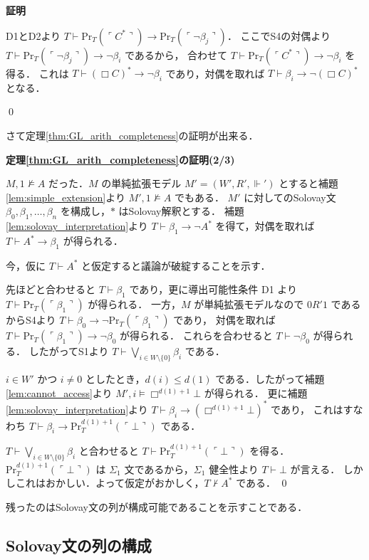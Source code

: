 \documentclass{jsarticle}
\makeatletter
\newcommand*{\Provable}{\mathrm{Pr}}
\theoremstyle{definition}
\renewcommand{\proofname}{証明}
\renewenvironment{proof}[1][\proofname]{\par
    \normalfont 
    \topsep6\p@\@plus6\p@\relax
    \trivlist
    \item\relax
    {\bfseries\gtfamily
    #1\@addpunct{.}}\hspace\labelsep\ignorespaces
    }{%
    \endtrivlist
    \@endpefalse
}
\makeatother
\begin{document}
\begin{proof}
\begin{itemize}
\begin{enumerate}
                D1とD2より $T \vdash \Provable_T(\ulcorner C^* \urcorner) \to \Provable_T(\ulcorner \lnot \beta_j \urcorner)$．
                ここでS4の対偶より $T \vdash \Provable_T(\ulcorner \lnot \beta_j \urcorner) \to \lnot \beta_i$ であるから，
                合わせて $T \vdash \Provable_T(\ulcorner C^* \urcorner) \to \lnot \beta_i$ を得る．
                これは $T \vdash (\Box C)^* \to \lnot \beta_i$ であり，対偶を取れば $T \vdash \beta_i \to \lnot (\Box C)^*$ となる．
            \end{enumerate}
    \end{itemize}
    \qed
\end{proof}

さて定理\ref{thm:GL_arith_completeness}の証明が出来る．

\begin{proof}[定理\ref{thm:GL_arith_completeness}の証明(2/3)]
    $M,1 \nvDash A$ だった．$M$ の単純拡張モデル $M' = (W', R', \Vdash')$ とすると補題\ref{lem:simple_extension}より $M',1 \nvDash A$ でもある．
    $M'$ に対してのSolovay文 $\beta_0, \beta_1, \dots, \beta_n$ を構成し，$*$ はSolovay解釈とする．
    補題\ref{lem:solovay_interpretation}より $T \vdash \beta_1 \to \lnot A^*$ を得て，対偶を取れば $T \vdash A^* \to \beta_1$ が得られる．

    今，仮に $T \vdash A^*$ と仮定すると議論が破綻することを示す．
    
    先ほどと合わせると $T \vdash \beta_1$ であり，更に導出可能性条件 D1 より $T \vdash \Provable_T(\ulcorner \beta_1 \urcorner)$ が得られる．
    一方，$M$ が単純拡張モデルなので $0 R' 1$ であるからS4より $T \vdash \beta_0 \to \lnot \Provable_T(\ulcorner \beta_1 \urcorner)$ であり，
    対偶を取れば $T \vdash \Provable_T(\ulcorner \beta_1 \urcorner) \to \lnot \beta_0$ が得られる．
    これらを合わせると $T \vdash \lnot \beta_0$ が得られる．
    したがってS1より $T \vdash \bigvee_{i \in W \setminus \{0\}} \beta_i$ である． 

    $i \in W'$ かつ $i \neq 0$ としたとき，$d(i) \leq d(1)$ である．したがって補題 \ref{lem:cannot_access}より
    $M',i \vDash \Box^{d(1) + 1} \bot$ が得られる．
    更に補題\ref{lem:solovay_interpretation}より $T \vdash \beta_i \to (\Box^{d(1) + 1} \bot)^*$ であり，
    これはすなわち $T \vdash \beta_{i} \to \Provable^{d(1) + 1}_T(\ulcorner \bot \urcorner)$ である．

    $T \vdash \bigvee_{i \in W \setminus \{0\}} \beta_i$ と合わせると $T \vdash \Provable^{d(1) + 1}_T(\ulcorner \bot \urcorner)$ を得る．
    $\Provable^{d(1) + 1}_T(\ulcorner \bot \urcorner)$ は $\Sigma_1$ 文であるから，$\Sigma_1$ 健全性より $T \vdash \bot$ が言える．
    しかしこれはおかしい．よって仮定がおかしく，$T \nvdash A^*$ である．
    \qed
\end{proof}

残ったのはSolovay文の列が構成可能であることを示すことである．

\subsection{Solovay文の列の構成}

\printbibliography
\end{document}
